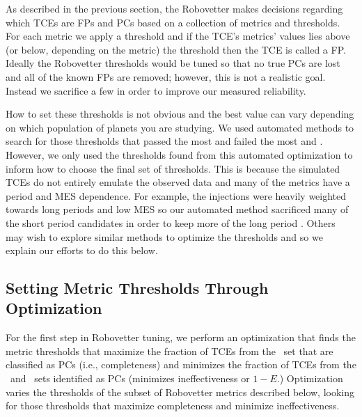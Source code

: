 \label{s:optimize}
As described in the previous section, the Robovetter makes decisions regarding which TCEs are FPs and PCs based on a collection of metrics and thresholds.  For each metric we apply a threshold and if the TCE's metrics' values lies above (or below, depending on the metric) the threshold then the TCE is called a FP.  Ideally the Robovetter thresholds would be tuned so that no true PCs are lost and all of the known FPs are removed; however, this is not a realistic goal.  Instead we sacrifice a few  in order to improve our measured reliability.

How to set these thresholds is not obvious and the best value can vary depending on which population of planets you are studying.  We used automated methods to search for those thresholds that passed the most  and failed the most  and . However, we only used the thresholds found from this automated optimization to inform how to choose the final set of thresholds. This is because the simulated TCEs do not entirely emulate the observed data and many of the metrics have a period and MES dependence.  For example, the injections were heavily weighted towards long periods and low MES so our automated method sacrificed many of the short period candidates in order to keep more of the long period . Others may wish to explore similar methods to optimize the thresholds and so we explain our efforts to do this below.  




\subsection{Setting Metric Thresholds Through Optimization}
\label{s:full_optimize}
For the first step in Robovetter tuning, we perform an optimization that finds the metric thresholds that maximize the fraction of TCEs from the \injtce\ set that are classified as PCs (i.e., completeness) and minimizes the fraction of TCEs from the \scrtce\ and \invtce\ sets identified as PCs (minimizes ineffectiveness or $1-E$.) Optimization varies the thresholds of the subset of Robovetter metrics described below, looking for those thresholds that maximize completeness and minimize ineffectiveness.

